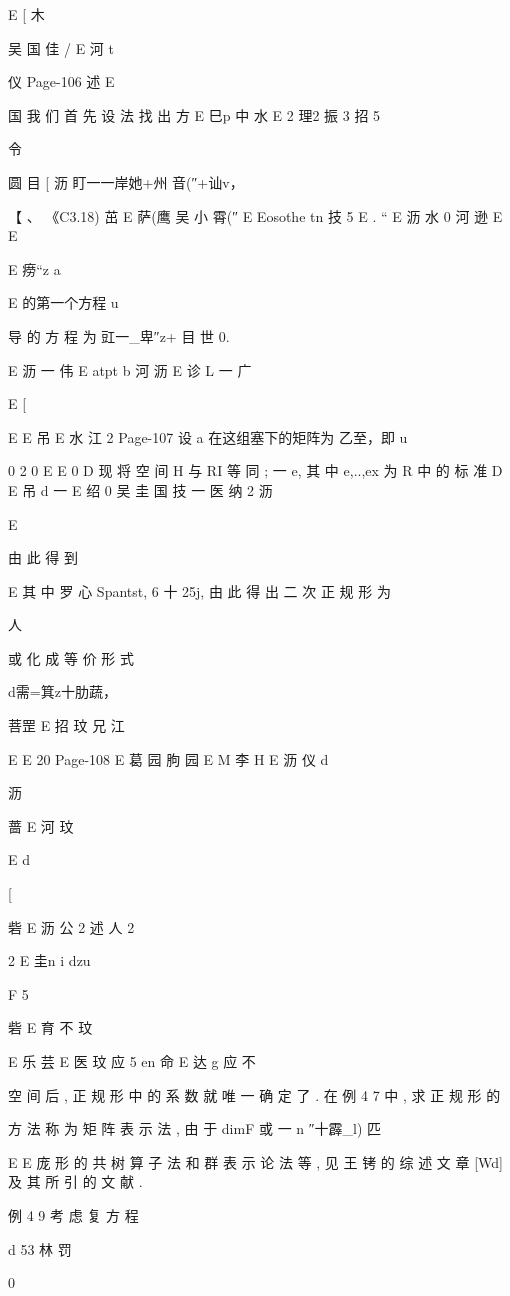 {{E
[ 木

吴 国
佳 /
E 河 t

仪
Page-106
述 E

国 我 们 首 先 设 法 找 出 方
E 巳p 中 水
E 2 理2 振 3 招 5

令

圆 目
[ 沥
盯一一岸她+州 音(″+讪v，

【 、 《C3.18)
茁 E 萨(鹰 吴 小 霄(″ E
Eosothe tn 技 5
E .
“ E 沥 水 0 河 逊
E
E

E 痨“z a

E 的第一个方程 u

导 的 方 程 为
豇一_卑″z+ 目 世 0.

E 沥 一 伟
E atpt b 河 沥
E 诊 L 一 广

E [

E
E 吊 E 水 江 2
Page-107
设 a 在这组塞下的矩阵为 乙至，即
u

0
2
0
E
E
0 D
现 将 空 间 H 与 RI 等 同 ; 一 e, 其 中 e,..,ex 为 R 中 的 标 准
D
E 吊 d 一
E 绍 0 吴 圭 国 技 一
医 纳 2 沥

E

由 此 得 到

E
其 中 罗 心 Spantst, 6 十 25j, 由 此 得 出 二 次 正 规 形 为

人

或 化 成 等 价 形 式

d需=箕z十肋蔬，

菩罡 E 招 玟 兄 江

E
E 20
Page-108
E 葛
园 朐 园 E
M 李 H
E 沥 仪 d

沥

蔷 E 河 玟

E
d

[

砦 E 沥 公 2 述 人 2

2
E 圭n i
dzu

F 5

砦 E 育 不 玟

E 乐 芸
E 医 玟 应 5 en 命
E 达 g 应 不

空 间 后 , 正 规 形 中 的 系 数 就 唯 一 确 定 了 . 在 例 4 7 中 , 求 正 规 形 的

方 法 称 为 矩 阵 表 示 法 , 由 于 dimF 或 一 n ″十霹_l) 匹

E
E 庞
形 的 共 树 算 子 法 和 群 表 示 论 法 等 , 见 王 铐 的 综 述 文 章 [Wd] 及 其
所 引 的 文 献 .

例 4 9 考 虑 复 方 程

d 53
林 罚

0

}}
